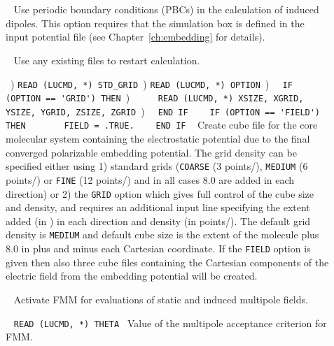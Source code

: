 \begin{description}
\item[]\verb| |\newline
Use periodic boundary conditions (PBCs) in the calculation of induced dipoles. This
option requires that the simulation box is defined in the input potential file (see Chapter~\ref{ch:embedding} for details).

\item[]\verb| |\newline
Use any existing files to restart calculation.

\item[]\verb| |) \verb|READ (LUCMD, *) STD_GRID|\verb| |) \verb|READ (LUCMD, *) OPTION|\verb| |) \verb|  IF (OPTION == 'GRID') THEN|\verb| |) \verb|     READ (LUCMD, *) XSIZE, XGRID, YSIZE, YGRID, ZSIZE, ZGRID|\verb| |) \verb|  END IF| \verb| |\newline
\verb|  IF (OPTION == 'FIELD') THEN|\verb| |\newline
\verb|      FIELD = .TRUE.| \verb| |\newline
\verb|  END IF| \verb| |\newline
Create cube file for the core molecular system containing the
electrostatic potential due to the final converged polarizable
embedding potential. The grid density can be specified either
using 1) standard grids (\verb|COARSE| (3 points/\bohr{}), \verb|MEDIUM| (6 points/\bohr{})
or \verb|FINE| (12 points/\bohr{}) and in all cases 8.0 \bohr{} are added in each direction) or 2) the \verb|GRID|
option which gives full control of the cube size and density, and
requires an additional input line specifying the extent added (in \bohr{}) in each direction and
density (in points/\bohr{}). The default grid density is \verb|MEDIUM| and default cube size
is the extent of the molecule plus 8.0 \bohr{} in plus and minus each
Cartesian coordinate.
If the \verb|FIELD| option is given then also three cube files
containing the Cartesian components of the electric field from the
embedding potential will be created.

\item[]\verb| |\newline
Activate FMM for evaluations of static and induced multipole fields.

\item[]\verb| |\newline
\verb|READ (LUCMD, *) THETA|\verb| |\newline
Value of the multipole acceptance criterion for FMM.


\end{description}
